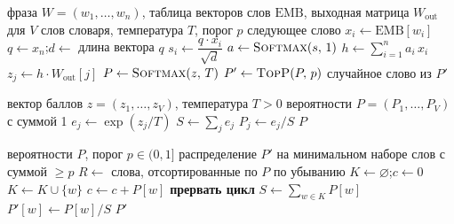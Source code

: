 \documentclass[a4paper,12pt]{article}
\begin{document}
\begin{algorithm}
\caption{Выбор следующего слова}\label{alg:next}
\begin{algorithmic}[1]
\Require фраза $W=(w_1,\dots,w_n)$, таблица векторов слов $\mathrm{EMB}$, выходная матрица $W_{\mathrm{out}}$ для $V$ слов словаря, температура $T$, порог $p$
\Ensure следующее слово
     
        \State $x_i \gets \mathrm{EMB}[w_i]$
    \EndFor
    \State $q \gets x_n$;\quad $d \gets$ длина вектора $q$ 
        \State $s_i \gets \dfrac{q \cdot x_i}{\sqrt{d}}$
    \EndFor
    \State $a \gets \Call{Softmax}{s,\,1}$ 
    \State $h \gets \sum_{i=1}^{n} a_i\, x_i$ 
     
        \State $z_j \gets h \cdot W_{\mathrm{out}}[j]$
    \EndFor
    \State $P \gets \Call{Softmax}{z,\,T}$ 
    \State $P' \gets \Call{TopP}{P,\,p}$ 
    \State \Return случайное слово из $P'$ 
\EndFunction
\end{algorithmic}
\end{algorithm}

\begin{algorithm}
\caption{Softmax с температурой}\label{alg:softmax}
\begin{algorithmic}[1]
\Require вектор баллов $z=(z_1,\dots,z_V)$, температура $T>0$
\Ensure вероятности $P=(P_1,\dots,P_V)$ с суммой 1
        \State $e_j \gets \exp(z_j / T)$
    \EndFor
    \State $S \gets \sum_j e_j$
        \State $P_j \gets e_j / S$
    \EndFor
    \State \Return $P$
\EndFunction
\end{algorithmic}
\end{algorithm}

\begin{algorithm}
\caption{Top-p фильтрация}\label{alg:topp}
\begin{algorithmic}[1]
\Require вероятности $P$, порог $p\in(0,1]$
\Ensure распределение $P'$ на минимальном наборе слов с суммой $\ge p$
    \State $R \gets$ слова, отсортированные по $P$ по убыванию 
    \State $K \gets \varnothing$;\quad $c \gets 0$
        \State $K \gets K \cup \{w\}$
        \State $c \gets c + P[w]$ 
            \State \textbf{прервать цикл}
        \EndIf
    \EndFor
    \State $S \gets \sum_{w\in K} P[w]$
        \State $P'[w] \gets P[w] / S$
    \EndFor
    \State \Return $P'$
\EndFunction
\end{algorithmic}
\end{algorithm}
\end{document}
